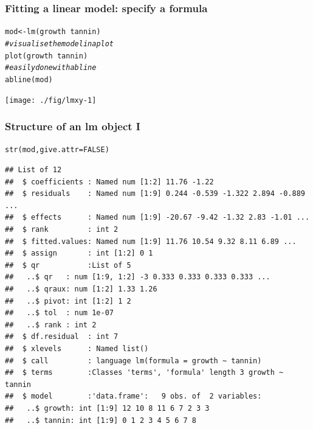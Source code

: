\documentclass[xcolor=table, xcolor=dvipsnames]{beamer}\usepackage[]{graphicx}\usepackage[]{color}
\makeatletter
\newcommand{\hlnum}[1]{\textcolor[rgb]{0,0,0}{#1}}
\newcommand{\hlcom}[1]{\textcolor[rgb]{0,0.392,0}{\textit{#1}}}
\newcommand{\hlopt}[1]{\textcolor[rgb]{0,0,0}{#1}}
\newcommand{\hlstd}[1]{\textcolor[rgb]{0,0,0}{#1}}
\newcommand{\hlkwb}[1]{\textcolor[rgb]{0,0,0}{#1}}
\newcommand{\hlkwc}[1]{\textcolor[rgb]{1,0,1}{#1}}
\newcommand{\hlkwd}[1]{\textcolor[rgb]{0,0,1}{#1}}
\newenvironment{kframe}{%
 \def\at@end@of@kframe{}%
 \ifinner\ifhmode%
  \def\at@end@of@kframe{\end{minipage}}%
  \begin{minipage}{\columnwidth}%
 \fi\fi%
 \def\FrameCommand##1{\hskip\@totalleftmargin \hskip-\fboxsep
 \colorbox{shadecolor}{##1}\hskip-\fboxsep
     \hskip-\linewidth \hskip-\@totalleftmargin \hskip\columnwidth}%
 \MakeFramed {\advance\hsize-\width
   \@totalleftmargin\z@ \linewidth\hsize
   \@setminipage}}%
 {\par\unskip\endMakeFramed%
 \at@end@of@kframe}
\newenvironment{knitrout}{}{} %
\makeatother
\begin{document}

\begin{frame}[fragile]\frametitle{Fitting a linear model: specify a formula}
\begin{knitrout}
\color{fgcolor}\begin{kframe}
\begin{alltt}
\hlstd{mod} \hlkwb{<-} \hlkwd{lm}\hlstd{(growth}\hlopt{~}\hlstd{tannin)}
\hlcom{# visualise the model in a plot}
\hlkwd{plot}\hlstd{(growth}\hlopt{~}\hlstd{tannin)}
\hlcom{# easily done with abline}
\hlkwd{abline}\hlstd{(mod)}
\end{alltt}
\end{kframe}

{\centering \texttt{[image: ./fig/lmxy-1]} 

}



\end{knitrout}
\end{frame}


\begin{frame}[fragile]\frametitle{Structure of an lm object I}
\begin{knitrout}\scriptsize
{}\color{fgcolor}\begin{kframe}
\begin{alltt}
\hlkwd{str}\hlstd{(mod,} \hlkwc{give.attr}\hlstd{=}\hlnum{FALSE}\hlstd{)}
\end{alltt}
\begin{verbatim}
## List of 12
##  $ coefficients : Named num [1:2] 11.76 -1.22
##  $ residuals    : Named num [1:9] 0.244 -0.539 -1.322 2.894 -0.889 ...
##  $ effects      : Named num [1:9] -20.67 -9.42 -1.32 2.83 -1.01 ...
##  $ rank         : int 2
##  $ fitted.values: Named num [1:9] 11.76 10.54 9.32 8.11 6.89 ...
##  $ assign       : int [1:2] 0 1
##  $ qr           :List of 5
##   ..$ qr   : num [1:9, 1:2] -3 0.333 0.333 0.333 0.333 ...
##   ..$ qraux: num [1:2] 1.33 1.26
##   ..$ pivot: int [1:2] 1 2
##   ..$ tol  : num 1e-07
##   ..$ rank : int 2
##  $ df.residual  : int 7
##  $ xlevels      : Named list()
##  $ call         : language lm(formula = growth ~ tannin)
##  $ terms        :Classes 'terms', 'formula' length 3 growth ~ tannin
##  $ model        :'data.frame':	9 obs. of  2 variables:
##   ..$ growth: int [1:9] 12 10 8 11 6 7 2 3 3
##   ..$ tannin: int [1:9] 0 1 2 3 4 5 6 7 8
\end{verbatim}
\end{kframe}
\end{knitrout}
\end{frame}
\end{document}
